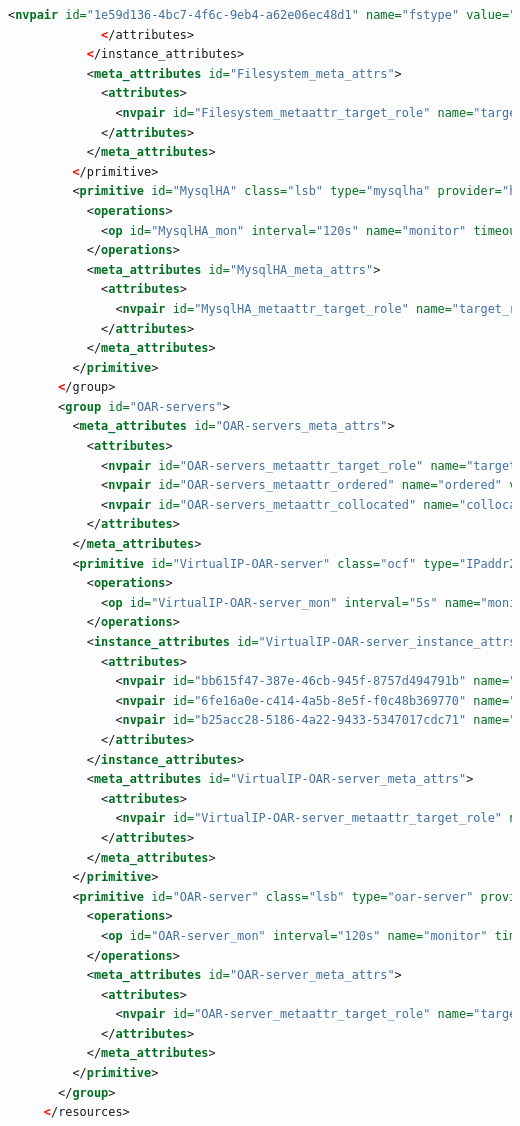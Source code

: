 \documentclass[a4paper,10pt]{report}
\begin{document}
\begin{lstlisting}[language=xml]
               <nvpair id="1e59d136-4bc7-4f6c-9eb4-a62e06ec48d1" name="fstype" value="ext3"/>
             </attributes>
           </instance_attributes>
           <meta_attributes id="Filesystem_meta_attrs">
             <attributes>
               <nvpair id="Filesystem_metaattr_target_role" name="target_role" value="started"/>
             </attributes>
           </meta_attributes>
         </primitive>
         <primitive id="MysqlHA" class="lsb" type="mysqlha" provider="heartbeat">
           <operations>
             <op id="MysqlHA_mon" interval="120s" name="monitor" timeout="60s"/>
           </operations>
           <meta_attributes id="MysqlHA_meta_attrs">
             <attributes>
               <nvpair id="MysqlHA_metaattr_target_role" name="target_role" value="started"/>
             </attributes>
           </meta_attributes>
         </primitive>
       </group>
       <group id="OAR-servers">
         <meta_attributes id="OAR-servers_meta_attrs">
           <attributes>
             <nvpair id="OAR-servers_metaattr_target_role" name="target_role" value="stopped"/>
             <nvpair id="OAR-servers_metaattr_ordered" name="ordered" value="true"/>
             <nvpair id="OAR-servers_metaattr_collocated" name="collocated" value="true"/>
           </attributes>
         </meta_attributes>
         <primitive id="VirtualIP-OAR-server" class="ocf" type="IPaddr2" provider="heartbeat">
           <operations>
             <op id="VirtualIP-OAR-server_mon" interval="5s" name="monitor" timeout="5s"/>
           </operations>
           <instance_attributes id="VirtualIP-OAR-server_instance_attrs">
             <attributes>
               <nvpair id="bb615f47-387e-46cb-945f-8757d494791b" name="ip" value="172.16.16.220"/>
               <nvpair id="6fe16a0e-c414-4a5b-8e5f-f0c48b369770" name="nic" value="eth1"/>
               <nvpair id="b25acc28-5186-4a22-9433-5347017cdc71" name="cidr_netmask" value="24"/>
             </attributes>
           </instance_attributes>
           <meta_attributes id="VirtualIP-OAR-server_meta_attrs">
             <attributes>
               <nvpair id="VirtualIP-OAR-server_metaattr_target_role" name="target_role" value="started"/>
             </attributes>
           </meta_attributes>
         </primitive>
         <primitive id="OAR-server" class="lsb" type="oar-server" provider="heartbeat">
           <operations>
             <op id="OAR-server_mon" interval="120s" name="monitor" timeout="60s"/>
           </operations>
           <meta_attributes id="OAR-server_meta_attrs">
             <attributes>
               <nvpair id="OAR-server_metaattr_target_role" name="target_role" value="started"/>
             </attributes>
           </meta_attributes>
         </primitive>
       </group>
     </resources>





\end{lstlisting}
\end{document}
